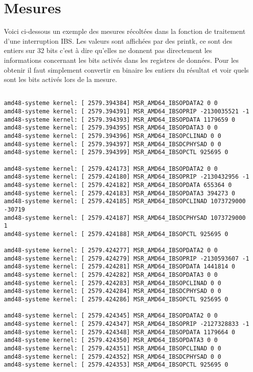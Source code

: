 	\section{Mesures}
		Voici ci-dessous un exemple des mesures récoltées dans la fonction de traitement d'une interruption IBS. Les valeurs sont affichées par des printk, ce sont des entiers sur 32 bits c'est à dire qu'elles ne donnent pas directement les informations concernant les bits activés dans les registres de données. Pour les obtenir il faut simplement convertir en binaire les entiers du résultat et voir quels sont les bits activés lors de la mesure.
		\begin{verbatim}

amd48-systeme kernel: [ 2579.394384] MSR_AMD64_IBSOPDATA2 0 0
amd48-systeme kernel: [ 2579.394391] MSR_AMD64_IBSOPRIP -2130035521 -1
amd48-systeme kernel: [ 2579.394393] MSR_AMD64_IBSOPDATA 1179659 0
amd48-systeme kernel: [ 2579.394395] MSR_AMD64_IBSOPDATA3 0 0
amd48-systeme kernel: [ 2579.394396] MSR_AMD64_IBSOPCLINAD 0 0
amd48-systeme kernel: [ 2579.394397] MSR_AMD64_IBSDCPHYSAD 0 0
amd48-systeme kernel: [ 2579.394399] MSR_AMD64_IBSOPCTL 925695 0

amd48-systeme kernel: [ 2579.424173] MSR_AMD64_IBSOPDATA2 0 0
amd48-systeme kernel: [ 2579.424180] MSR_AMD64_IBSOPRIP -2130432956 -1
amd48-systeme kernel: [ 2579.424182] MSR_AMD64_IBSOPDATA 655364 0
amd48-systeme kernel: [ 2579.424183] MSR_AMD64_IBSOPDATA3 394273 0
amd48-systeme kernel: [ 2579.424185] MSR_AMD64_IBSOPCLINAD 1073729000 -30719
amd48-systeme kernel: [ 2579.424187] MSR_AMD64_IBSDCPHYSAD 1073729000 1
amd48-systeme kernel: [ 2579.424188] MSR_AMD64_IBSOPCTL 925695 0

amd48-systeme kernel: [ 2579.424277] MSR_AMD64_IBSOPDATA2 0 0
amd48-systeme kernel: [ 2579.424279] MSR_AMD64_IBSOPRIP -2130593607 -1
amd48-systeme kernel: [ 2579.424281] MSR_AMD64_IBSOPDATA 1441814 0
amd48-systeme kernel: [ 2579.424282] MSR_AMD64_IBSOPDATA3 0 0
amd48-systeme kernel: [ 2579.424283] MSR_AMD64_IBSOPCLINAD 0 0
amd48-systeme kernel: [ 2579.424284] MSR_AMD64_IBSDCPHYSAD 0 0
amd48-systeme kernel: [ 2579.424286] MSR_AMD64_IBSOPCTL 925695 0

amd48-systeme kernel: [ 2579.424345] MSR_AMD64_IBSOPDATA2 0 0
amd48-systeme kernel: [ 2579.424347] MSR_AMD64_IBSOPRIP -2127328833 -1
amd48-systeme kernel: [ 2579.424348] MSR_AMD64_IBSOPDATA 1179664 0
amd48-systeme kernel: [ 2579.424350] MSR_AMD64_IBSOPDATA3 0 0
amd48-systeme kernel: [ 2579.424351] MSR_AMD64_IBSOPCLINAD 0 0
amd48-systeme kernel: [ 2579.424352] MSR_AMD64_IBSDCPHYSAD 0 0
amd48-systeme kernel: [ 2579.424353] MSR_AMD64_IBSOPCTL 925695 0


\end{verbatim}
